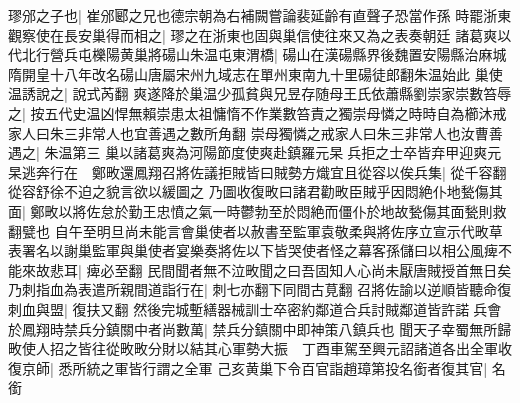 璆邠之子也|{
	崔邠郾之兄也德宗朝為右補闕嘗論裴延齡有直聲子恐當作孫}
時罷浙東觀察使在長安巢得而相之|{
	璆之在浙東也固與巢信使往來又為之表奏朝廷}
諸葛爽以代北行營兵屯櫟陽黄巢將碭山朱温屯東渭橋|{
	碭山在漢碭縣界後魏置安陽縣治麻城隋開皇十八年改名碭山唐屬宋州九域志在單州東南九十里碭徒郎翻朱温始此}
巢使温誘說之|{
	說式芮翻}
爽遂降於巢温少孤貧與兄昱存随母王氏依蕭縣劉崇家崇數笞辱之|{
	按五代史温凶悍無賴崇患太祖慵惰不作業數笞責之獨崇母憐之時時自為櫛沐戒家人曰朱三非常人也宜善遇之數所角翻}
崇母獨憐之戒家人曰朱三非常人也汝曹善遇之|{
	朱温第三}
巢以諸葛爽為河陽節度使爽赴鎮羅元杲兵拒之士卒皆弃甲迎爽元杲逃奔行在　鄭畋還鳳翔召將佐議拒賊皆曰賊勢方熾宜且從容以俟兵集|{
	從千容翻從容舒徐不迫之貌言欲以緩圖之}
乃圖收復畋曰諸君勸畋臣賊乎因悶絶仆地甃傷其面|{
	鄭畋以將佐怠於勤王忠憤之氣一時鬱勃至於悶絶而僵仆於地故甃傷其面甃則救翻甓也}
自午至明旦尚未能言會巢使者以赦書至監軍袁敬柔與將佐序立宣示代畋草表署名以謝巢監軍與巢使者宴樂奏將佐以下皆哭使者怪之幕客孫儲曰以相公風痺不能來故悲耳|{
	痺必至翻}
民間聞者無不泣畋聞之曰吾固知人心尚未厭唐賊授首無日矣乃刺指血為表遣所親間道詣行在|{
	刺七亦翻下同間古莧翻}
召將佐諭以逆順皆聽命復刺血與盟|{
	復扶又翻}
然後完城塹繕器械訓士卒密約鄰道合兵討賊鄰道皆許諾兵會於鳳翔時禁兵分鎮關中者尚數萬|{
	禁兵分鎮關中即神策八鎮兵也}
聞天子幸蜀無所歸畋使人招之皆往從畋畋分財以結其心軍勢大振　丁酉車駕至興元詔諸道各出全軍收復京師|{
	悉所統之軍皆行謂之全軍}
己亥黄巢下令百官詣趙璋第投名銜者復其官|{
	名銜}


